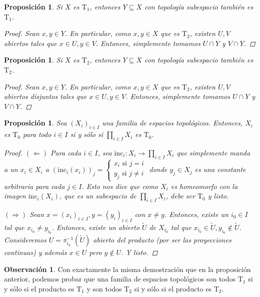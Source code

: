 \documentclass[12pt]{book}
\newtheorem{prop}[teo]{Proposición}
\theoremstyle{definition}
\newtheorem{obs}[teo]{Observación}
\begin{document}
\begin{prop}
Si $X$ es $\mathrm{T}_1$, entonces $Y\subseteq X$ con topología subespacio también es $\mathrm{T}_1$.
\begin{proof}
Sean $x,y\in Y$. En particular, como $x,y\in X$ que es $\mathrm{T}_2$, existen $U,V$ abiertos tales que $x\in U, y\in V$. Entonces, simplemente tomamos $U\cap Y$ y $V\cap Y$.
\end{proof}
\end{prop}

\begin{prop}
Si $X$ es $\mathrm{T}_2$, entonces $Y\subseteq X$ con topología subespacio también es $\mathrm{T}_2$.
\begin{proof}
Sean $x,y\in Y$. En particular, como $x,y\in X$ que es $\mathrm{T}_2$, existen $U,V$ abiertos disjuntos tales que $x\in U, y\in V$. Entonces, simplemente tomamos $U\cap Y$ y $V\cap Y$.
\end{proof}
\end{prop}

\begin{prop}
Sea $(X_i)_{i\in I}$ una familia de espacios topológicos. Entonces, $X_i$ es $\mathrm{T}_0$ para todo $i\in I$ si y sólo si $\displaystyle\prod_{i\in I}X_i$ es $\mathrm{T}_0$.
\begin{proof}
$(\Longleftarrow)$ Para cada $i\in I$, sea $\mathrm{inc}_{i}:X_i\to \displaystyle\prod_{i\in I}X_i$ que simplemente manda a un $x_i\in X_i$ a $(\mathrm{inc}_i(x_i))_j = \begin{cases} x_i \text{ si }j=i \\ y_j \text{ si } j\neq i\end{cases}$ donde $y_j\in X_j$ es una constante arbitraria para cada $j\in I$. Esto nos dice que como $X_i$ es homeomorfo con la imagen $\mathrm{inc}_i(X_i)$, que es un subespacio de $\displaystyle\prod_{i\in I}X_i$, debe ser $\mathrm{T}_0$ y listo.

$(\Longrightarrow)$ Sean $x=(x_i)_{i\in I}, y=(y_i)_{i\in I}$ con $x\neq y$. Entonces, existe un $i_0\in I$ tal que $x_{i_0}\neq y_{i_0}$. Entonces, existe un abierto $\tilde{U}$ de $X_{i_0}$ tal que $x_{i_0}\in \tilde{U}, y_{i_0}\notin \tilde{U}$. Consideremos $U=\pi_{i_0}^{-1}(\tilde{U})$ abierto del producto (por ser las proyecciones continuas) y además $x\in U$ pero $y\notin U$. Y listo.
\end{proof}
\end{prop}

\begin{obs}
Con exactamente la misma demostración que en la proposición anterior, podemos probar que una familia de espacios topológicos son todos $\mathrm{T}_1$ si y sólo si el producto es $\mathrm{T}_1$ y son todos $\mathrm{T}_2$ si y sólo si el producto es $\mathrm{T}_2$.
\end{obs}
\end{document}
